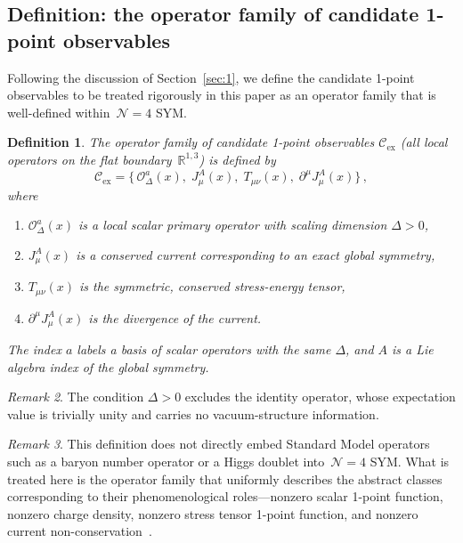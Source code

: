 \documentclass[
  aps,
  prd,
  preprint,
  groupedaddress,
  nofootinbib,
  longbibliography
]{revtex4-2}
\newtheorem{definition}{Definition}[section]
\theoremstyle{remark}
\newtheorem{remark}[definition]{Remark}
\newcommand{\Cex}{\mathcal{C}_{\mathrm{ex}}}
\newcommand{\N}{\mathcal{N}}
\begin{document}
\subsection{Definition: the operator family of candidate 1-point
  observables}\label{subsec:2-1}

Following the discussion of Section~\ref{sec:1}, we define the
candidate 1-point observables to be treated rigorously in this paper
as an operator family that is well-defined within~$\N=4$ SYM.

\begin{definition}\label{def:Cex}
The operator family of candidate 1-point observables $\Cex$
(all local operators on the flat boundary~$\mathbb{R}^{1,3}$) is
defined by
\begin{equation}\label{eq:Cex}
  \Cex = \bigl\{\,
    \mathcal{O}_\Delta^a(x),\;
    J_\mu^A(x),\;
    T_{\mu\nu}(x),\;
    \partial^\mu J_\mu^A(x)
  \bigr\}\,,
\end{equation}
where
\begin{enumerate}
\item $\mathcal{O}_\Delta^a(x)$ is a local scalar primary operator
  with scaling dimension $\Delta>0$,
\item $J_\mu^A(x)$ is a conserved current corresponding to an
  exact global symmetry,
\item $T_{\mu\nu}(x)$ is the symmetric, conserved stress-energy
  tensor,
\item $\partial^\mu J_\mu^A(x)$ is the divergence of the current.
\end{enumerate}
The index $a$ labels a basis of scalar operators with the same
$\Delta$, and $A$ is a Lie algebra index of the global symmetry.
\end{definition}

\begin{remark}\label{rem:Delta-positive}
The condition $\Delta>0$ excludes the identity operator, whose
expectation value is trivially unity and carries no
vacuum-structure information.
\end{remark}

\begin{remark}\label{rem:Cex-not-SM}
This definition does not directly embed Standard Model operators
such as a baryon number operator or a Higgs doublet into~$\N=4$ SYM.
What is treated here is the operator family that uniformly describes
the abstract classes corresponding to their phenomenological
roles---nonzero scalar 1-point function, nonzero charge density,
nonzero stress tensor 1-point function, and nonzero current
non-conservation~\cite{ref4,ref7,ref8}.
\end{remark}
\end{document}

